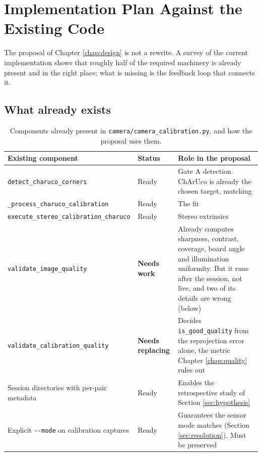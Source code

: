 \chapter{Implementation Plan Against the Existing Code}
\label{chap:plan}

The proposal of Chapter \ref{chap:design} is not a rewrite. A survey of the current implementation shows that roughly half of the required machinery is already present and in the right place; what is missing is the feedback loop that connects it.

\section{What already exists}

\begin{table}[!ht]
\centering
\small
\caption[Existing calibration code relevant to the proposal]{Components already present in \texttt{camera/camera\_calibration.py}, and how the proposal uses them.}
\label{tab:existing}
\footnotesize
\setlength{\tabcolsep}{4pt}
\begin{tabularx}{\textwidth}{>{\raggedright\arraybackslash}p{} p{} X}
\toprule
\textbf{Existing component} & \textbf{Status} & \textbf{Role in the proposal} \\
\midrule
\texttt{detect\_charuco\_corners} & Ready & Gate A detection. ChArUco is already the chosen target, matching \cite{rojtberg2018pose} \\
\texttt{\_process\_charuco\_\allowbreak calibration} & Ready & The fit \\
\texttt{execute\_stereo\_\allowbreak calibration\_charuco} & Ready & Stereo extrinsics \\
\texttt{validate\_image\_quality} & \textbf{Needs work} & Already computes sharpness, contrast, coverage, board angle and illumination uniformity. But it runs after the session, not live, and two of its details are wrong (below) \\
\texttt{validate\_calibration\_\allowbreak quality} & \textbf{Needs replacing} & Decides \texttt{is\_good\_quality} from the reprojection error alone, the metric Chapter \ref{chap:quality} rules out \\
Session directories with per-pair metadata & Ready & Enables the retrospective study of Section \ref{sec:hypothesis} \\
Explicit \texttt{-{}-mode} on calibration captures & Ready & Guarantees the sensor mode matches (Section \ref{sec:resolution}). Must be preserved \\
\bottomrule
\end{tabularx}
\end{table}

